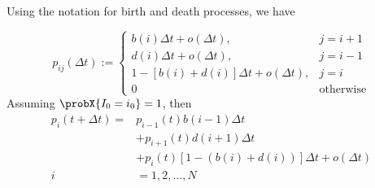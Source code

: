     \begin{frame}{}
        Using the notation for birth and death
        processes, we have

        \begin{equation*}
            p_{ij}(\Delta t):=
                \begin{cases}
                    b(i) \Delta t + o(\Delta t),     
                        & j = i + 1
                    \\
                    d(i) \Delta t + o(\Delta t), 
                        &   j = i - 1
                    \\
                    1 - \left [
                            b(i) + d(i) %
                        \right] \Delta t
                        + o(\Delta t), 
                        & j=i
                    \\
                    0 & \text{otherwise}
                \end{cases}
        \end{equation*}
        Assuming $\probX{I_0 = i_0} = 1$, then
        \begin{align*}
            p_i(t + \Delta t)
                =&
                    p_{i - 1} (t) b(i -1) \Delta t
                    \\
                    & + 
                        p_{i + 1} (t) d(i + 1) \Delta t
                    \\
                    & +
                        p_{i} (t)[1 - (b(i) + d(i))] \Delta t
                    + o(\Delta t)
            \\
            i &= 1, 2, \dots, N
        \end{align*}
    \end{frame}